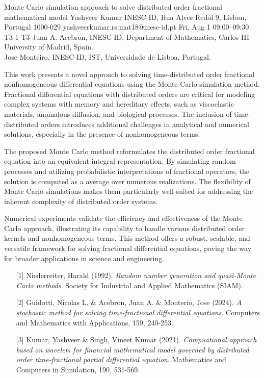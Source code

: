 \begin{talk}
  {Monte Carlo simulation approach to solve distributed order fractional mathematical model}%
  {Yashveer Kumar}%
  {INESC-ID, Rua Alves Redol 9, Lisbon, Portugal 1000-029}%
  {yashveerkumar.rs.mat18@inesc-id.pt}%
  {}%
  {}%
  {Fri, Aug 1 09:00–09:30}%
  {T3-1}%
  {T3}%
  {Juan A. Acebron, INESC-ID,  Department of Mathematics, Carlos III University of Madrid, Spain.\\
  	Jose Monteiro, INESC-ID, IST, Universidade de Lisboa, Portugal.}%
				
			
			
This work presents a novel approach to solving time-distributed order fractional nonhomogeneous differential equations using the Monte Carlo simulation method. Fractional differential equations with distributed orders are critical for modeling complex systems with memory and hereditary effects, such as viscoelastic materials, anomalous diffusion, and biological processes. The inclusion of time-distributed orders introduces additional challenges in analytical and numerical solutions, especially in the presence of nonhomogeneous terms.

The proposed Monte Carlo method reformulates the distributed order fractional equation into an equivalent integral representation. By simulating random processes and utilizing probabilistic interpretations of fractional operators, the solution is computed as a average over numerous realizations. The flexibility of Monte Carlo simulations makes them particularly well-suited for addressing the inherent complexity of distributed order systems.

Numerical experiments validate the efficiency and effectiveness of the Monte Carlo approach, illustrating its capability to handle various distributed order kernels and nonhomogeneous terms. This method offers a robust, scalable, and versatile framework for solving fractional differential equations, paving the way for broader applications in science and engineering.

\medskip
\begin{enumerate}
	\item[{[1]}] Niederreiter, Harald (1992). {\it Random number generation and quasi-Monte Carlo methods}. Society for Industrial and Applied Mathematics (SIAM).
	\item[{[2]}] Guidotti, Nicolas L. \& Acebron, Juan A.  \&  Monterio, Jose (2024). {\it A stochastic method for solving time-fractional differential equations}. Computers and Mathematics with Applications, 159, 240-253.
	\item[{[3]}] Kumar, Yashveer \& Singh, Vineet Kumar (2021). {\it Compuational approach based on wavelets for financial mathematical model governed by distributed order time-fractional partial differential equation}. Mathematics and Computers in Simulation, 190, 531-569.
\end{enumerate}
\end{talk}

